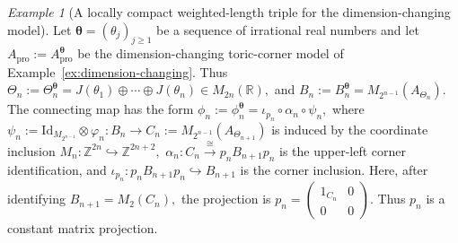 \documentclass[11pt]{amsart}
\theoremstyle{definition}
\theoremstyle{remark}
\newtheorem{example}[theorem]{Example}
\newcommand{\Z}{\mathbb{Z}}
\newcommand{\R}{\mathbb{R}}
\newcommand{\id}{\mathrm{Id}}
\newcommand{\ex}{\mathrm{pro}}
\begin{document}
\begin{example}[A locally compact weighted-length triple for the dimension-changing model]
\label{ex:dimension-changing-weighted-length-spectral}
 Let $\boldsymbol\theta=(\theta_j)_{j\geq1}$ be a sequence of irrational real numbers and
let $A_{\ex}:=A_{\ex}^{\boldsymbol\theta}$ be the dimension-changing toric-corner
model of Example~\ref{ex:dimension-changing}. Thus $\Theta_n:=\Theta_n^{\boldsymbol\theta}=J(\theta_1)\oplus\cdots\oplus J(\theta_n)\in M_{2n}(\R),$
and $B_n:=B_n^{\boldsymbol\theta}=M_{2^{n-1}}(A_{\Theta_n}).$
The connecting map has the form $\phi_n:=\phi_n^{\boldsymbol\theta}
=\iota_{p_n}\circ\alpha_n\circ\psi_n,$
where $\psi_n:=\id_{M_{2^{n-1}}}\otimes\varphi_n\colon B_n\longrightarrow
C_n:=M_{2^{n-1}}(A_{\Theta_{n+1}})$
is induced by the coordinate inclusion $M_n\colon \Z^{2n}\hookrightarrow \Z^{2n+2},$ $\alpha_n\colon C_n\xrightarrow{\cong}p_nB_{n+1}p_n$
is the upper-left corner identification, and $\iota_{p_n}\colon p_nB_{n+1}p_n\hookrightarrow B_{n+1}$
is the corner inclusion. Here, after identifying $B_{n+1}
=M_2(C_n),$
the projection is $p_n=
\begin{pmatrix}
1_{C_n}&0\\
0&0
\end{pmatrix}.$
Thus $p_n$ is a constant matrix projection.



\end{example}
\end{document}
